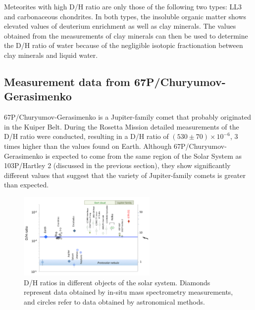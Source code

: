 Meteorites with high D/H ratio are only those of the following two types: LL3 and carbonaceous chondrites. In both types, the insoluble organic matter shows elevated values of deuterium enrichment as well as clay minerals. The values obtained from the measurements of clay minerals can then be used to determine the D/H ratio of water because of the negligible isotopic fractionation between clay minerals and liquid water. \cite{SolSystemDH_Robert}


\subsection{Measurement data from 67P/Churyumov-Gerasimenko}
67P/Churyumov-Gerasimenko is a Jupiter-family comet that probably originated in the Kuiper Belt. During the Rosetta Mission detailed measurements of the D/H ratio were conducted, resulting in a D/H ratio of $(530 \pm 70)\times10^{-6}$, 3 times higher than the values found on Earth. Although 67P/Churyumov-Gerasimenko is expected to come from the same region of the Solar System as 103P/Hartley 2 (discussed in the previous section), they show significantly different values that suggest that the variety of Jupiter-family comets is greater than expected.  

\begin{figure}
	\centering
	\includegraphics[width=0.6\textwidth]{figures/D_H_ratio_multiple_objects}
	\caption{D/H ratios in different objects of the solar system. Diamonds represent data obtained by in-situ mass spectrometry measurements, and circles refer to data obtained by astronomical methods. \cite{D/H_67P_science}}
	\label{fig::D/H_different_objects}
\end{figure}

